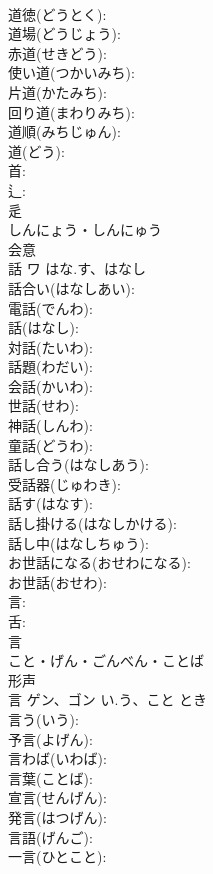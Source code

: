 \documentclass[8pt]{extreport}
\begin{document}
\begin{CJK}{UTF8}{min}
\\	道徳(どうとく): 
\\	道場(どうじょう): 
\\	赤道(せきどう): 
\\	使い道(つかいみち): 
\\	片道(かたみち): 
\\	回り道(まわりみち): 
\\	道順(みちじゅん): 
\\	道(どう): 
\\	首: 
\\	辶: 
\\	辵	
\\	しんにょう・しんにゅう	
\\	会意 
\\	話	ワ	はな.す、はなし		
\\	話合い(はなしあい): 
\\	電話(でんわ): 
\\	話(はなし): 
\\	対話(たいわ): 
\\	話題(わだい): 
\\	会話(かいわ): 
\\	世話(せわ): 
\\	神話(しんわ): 
\\	童話(どうわ): 
\\	話し合う(はなしあう): 
\\	受話器(じゅわき): 
\\	話す(はなす): 
\\	話し掛ける(はなしかける): 
\\	話し中(はなしちゅう): 
\\	お世話になる(おせわになる): 
\\	お世話(おせわ): 
\\	言: 
\\	舌: 
\\	言	
\\	こと・げん・ごんべん・ことば	
\\	形声 
\\	言	ゲン、ゴン	い.う、こと	とき	
\\	言う(いう): 
\\	予言(よげん): 
\\	言わば(いわば): 
\\	言葉(ことば): 
\\	宣言(せんげん): 
\\	発言(はつげん): 
\\	言語(げんご): 
\\	一言(ひとこと): 

\end{CJK}
\end{document}
